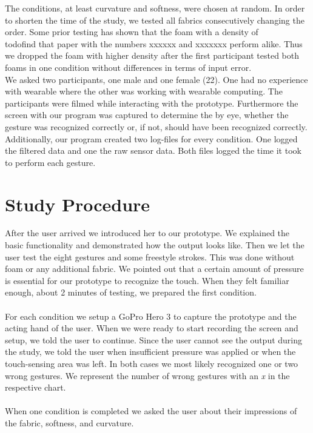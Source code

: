The conditions, at least curvature and softness, were chosen at random. In order to shorten the time of the study, we tested all fabrics consecutively changing the order. Some prior testing has shown that the foam with a density of \\todo{find that paper with the numbers} xxxxxx and xxxxxxx perform alike. Thus we dropped the  foam with higher density after the first participant tested both foams in one condition without differences in terms of input error. \\

We asked two participants, one male  and one female (22). One had no experience with wearable where the other was working with wearable computing. The participants were filmed while interacting with the prototype. Furthermore the screen with our program was captured to determine the by eye, whether the gesture was recognized correctly or, if not, should have been recognized correctly. Additionally, our program created two log-files for every condition. One logged the filtered data and one the raw sensor data. Both files logged the time it took to perform each gesture.

\section{Study Procedure}
After the user arrived we introduced her to our prototype. We explained the basic functionality and demonstrated how the output looks like. Then we let the user test the eight gestures and some freestyle strokes. This was done without foam or any additional fabric. We pointed out that a certain amount of pressure is essential for our prototype to recognize the touch. When they felt familiar enough, about 2 minutes of testing, we prepared the first condition. 
\\ \\
For each condition we setup a GoPro Hero 3 to capture the prototype and the acting hand of the user. When we were ready to start recording the screen and setup, we told the user to continue. Since the user cannot see the output during the study, we told the user when insufficient  pressure was applied or when the touch-sensing area was left. In both cases we most likely recognized one or two wrong gestures. We represent the number of wrong gestures with an \emph{x} in the respective chart. 
\\ \\
When one condition is completed we asked the user about their impressions of the fabric, softness, and curvature. 

